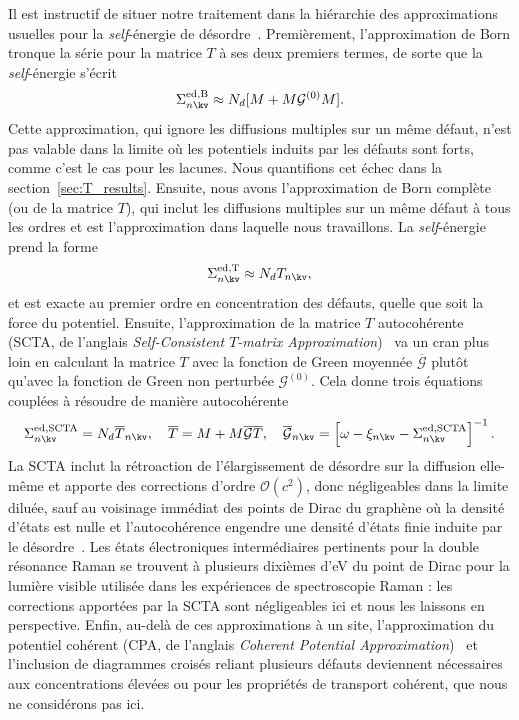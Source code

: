 Il est instructif de situer notre traitement dans la hiérarchie des approximations usuelles pour la \textit{self}-énergie de désordre~\cite{elliottTheoryPropertiesRandomly1974}. Premièrement, l'approximation de Born tronque la série pour la matrice $T$ à ses deux premiers termes, de sorte que la \textit{self}-énergie s'écrit
\begin{equation}
    \Sigma_{n\kv}^\text{ed,B}\approx N_d[M+M\mathcal{G}^{(0)}M].
\end{equation}
Cette approximation, qui ignore les diffusions multiples sur un même défaut, n'est pas valable dans la limite où les potentiels induits par les défauts sont forts, comme c'est le cas pour les lacunes. Nous quantifions cet échec dans la section~\ref{sec:T_results}. Ensuite, nous avons l'approximation de Born complète (ou de la matrice $T$), qui inclut les diffusions multiples sur un même défaut à tous les ordres et est l'approximation dans laquelle nous travaillons. La \textit{self}-énergie prend la forme
\begin{equation}
    \Sigma_{n\kv}^{\text{ed,T}}\approx N_dT_{n\kv},
\end{equation}
et est exacte au premier ordre en concentration des défauts, quelle que soit la force du potentiel. Ensuite, l'approximation de la matrice $T$ autocohérente (SCTA, de l'anglais \textit{Self-Consistent $T$-matrix Approximation})~\cite{klauderModificationElectronEnergy1961,peresElectronicPropertiesDisordered2006} va un cran plus loin en calculant la matrice $T$ avec la fonction de Green moyennée $\overline{\mathcal{G}}$ plutôt qu'avec la fonction de Green non perturbée $\mathcal{G}^{(0)}$. Cela donne trois équations couplées à résoudre de manière autocohérente
\begin{equation}
    \Sigma_{n\kv}^\text{ed,SCTA} = N_d\overline{T}_{n\kv},\quad \overline{T} = M+M\overline{\mathcal{G}}\overline{T},\quad \overline{\mathcal{G}}_{n\kv} = \left[\omega-\xi_{n\kv}-\Sigma_{n\kv}^\text{ed,SCTA} \right]^{-1}.
\end{equation}
La SCTA inclut la rétroaction de l'élargissement de désordre sur la diffusion elle-même et apporte des corrections d'ordre $\mathcal{O}(c^2)$, donc négligeables dans la limite diluée, sauf au voisinage immédiat des points de Dirac du graphène où la densité d'états est nulle et l'autocohérence engendre une densité d'états finie induite par le désordre~\cite{peresElectronicPropertiesDisordered2006}. Les états électroniques intermédiaires pertinents pour la double résonance Raman se trouvent à plusieurs dixièmes d'eV du point de Dirac pour la lumière visible utilisée dans les expériences de spectroscopie Raman : les corrections apportées par la SCTA sont négligeables ici et nous les laissons en perspective. Enfin, au-delà de ces approximations à un site, l'approximation du potentiel cohérent (CPA, de l'anglais \textit{Coherent Potential Approximation})~\cite{sovenCoherentPotentialModelSubstitutional1967} et l'inclusion de diagrammes croisés reliant plusieurs défauts deviennent nécessaires aux concentrations élevées ou pour les propriétés de transport cohérent, que nous ne considérons pas ici.

